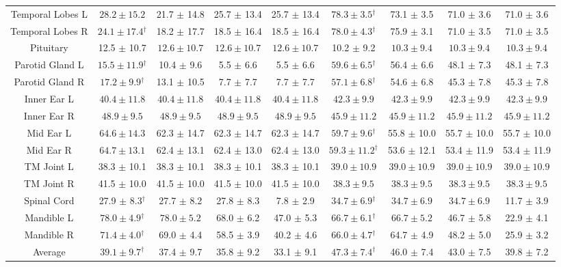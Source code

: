 \begin{table}[t!]
{\begin{tabular}{ccccccccc}
Temporal Lobes L &$\bm{28.2\pm15.2}$&21.7 $\pm$ 14.8& 25.7 $\pm$ 13.4& 25.7 $\pm$ 13.4&  $\bm{78.3\pm3.5}$$^\dagger$&  73.1 $\pm$ 3.5&   71.0 $\pm$ 3.6&  71.0 $\pm$ 3.6\\
Temporal Lobes R &$\bm{24.1\pm17.4}$$^\dagger$&18.2 $\pm$ 17.7& 18.5 $\pm$ 16.4& 18.5 $\pm$ 16.4&  $\bm{78.0\pm4.3}$$^\dagger$&  75.9 $\pm$ 3.1&   71.0 $\pm$ 3.5&  71.0 $\pm$ 3.5\\
Pituitary &12.5 $\pm$ 10.7&$\bm{12.6\pm10.7}$&$\bm{12.6\pm10.7}$&$\bm{12.6\pm10.7}$&  10.2 $\pm$ 9.2&  $\bm{10.3\pm9.4}$&   $\bm{10.3\pm9.4}$&  $\bm{10.3\pm9.4}$\\
Parotid Gland L &$\bm{15.5\pm11.9}$$^\dagger$& 10.4 $\pm$ 9.6& 5.5 $\pm$ 6.6& 5.5 $\pm$ 6.6&  $\bm{59.6\pm6.5}$$^\dagger$&  56.4 $\pm$ 6.6&   48.1 $\pm$ 7.3&  48.1 $\pm$ 7.3\\
Parotid Gland R &$\bm{17.2\pm9.9}$$^\dagger$&13.1 $\pm$ 10.5& 7.7 $\pm$ 7.7& 7.7 $\pm$ 7.7&  $\bm{57.1\pm6.8}$$^\dagger$ &  54.6 $\pm$ 6.8&   45.3 $\pm$ 7.8&  45.3 $\pm$ 7.8\\
Inner Ear L &$\bm{40.4\pm11.8}$&$\bm{40.4\pm11.8}$&$\bm{40.4\pm11.8}$&$\bm{40.4\pm11.8}$&  $\bm{42.3\pm9.9}$&  $\bm{42.3\pm9.9}$&  $\bm{42.3\pm9.9}$ & $\bm{42.3\pm9.9}$ \\
Inner Ear R &$\bm{48.9\pm9.5}$&$\bm{48.9\pm9.5}$&$\bm{48.9\pm9.5}$&$\bm{48.9\pm9.5}$& $\bm{45.9\pm11.2}$ & $\bm{45.9\pm11.2}$ & $\bm{45.9\pm11.2}$ & $\bm{45.9\pm11.2}$ \\
Mid Ear L &$\bm{64.6\pm14.3}$&62.3 $\pm$ 14.7& 62.3 $\pm$ 14.7& 62.3 $\pm$ 14.7& $\bm{59.7\pm9.6}$$^\dagger$ & 55.8 $\pm$ 10.0&  55.7 $\pm$ 10.0& 55.7 $\pm$ 10.0\\
Mid Ear R &$\bm{64.7\pm13.1}$&62.4 $\pm$ 13.1& 62.4 $\pm$ 13.0& 62.4 $\pm$ 13.0& $\bm{59.3\pm11.2}$$^\dagger$ & 53.6 $\pm$ 12.1&  53.4 $\pm$ 11.9& 53.4 $\pm$ 11.9\\
TM Joint L &38.3 $\pm$ 10.1&38.3 $\pm$ 10.1& 38.3 $\pm$ 10.1& 38.3 $\pm$ 10.1& $\bm{39.0\pm10.9}$ & $\bm{39.0\pm10.9}$ & $\bm{39.0\pm10.9}$ & $\bm{39.0\pm10.9}$ \\
TM Joint R &41.5 $\pm$ 10.0&41.5 $\pm$ 10.0& 41.5 $\pm$ 10.0& 41.5 $\pm$ 10.0&  $\bm{38.3\pm9.5}$&  $\bm{38.3\pm9.5}$&  $\bm{38.3\pm9.5}$& $\bm{38.3\pm9.5}$\\
Spinal Cord & 27.9 $\pm$ 8.3$^\dagger$& 27.7 $\pm$ 8.2&27.8 $\pm$ 8.3& 7.8 $\pm$ 2.9&  $\bm{34.7\pm6.9}$$^\dagger$ &  $\bm{34.7\pm6.9}$& $\bm{34.7\pm6.9}$& 11.7 $\pm$ 3.9\\
Mandible L & $\bm{78.0\pm4.9}$$^\dagger$& $\bm{78.0\pm5.2}$&68.0 $\pm$ 6.2& 47.0 $\pm$ 5.3& $\bm{66.7\pm6.1}$$^\dagger$ &  $\bm{66.7\pm5.2}$ &  46.7 $\pm$ 5.8&  22.9 $\pm$ 4.1\\
Mandible R & $\bm{71.4\pm4.0}$$^\dagger$ & 69.0 $\pm$ 4.4&58.5 $\pm$ 3.9& 40.2 $\pm$ 4.6& $\bm{66.0\pm4.7}$$^\dagger$ &  64.7 $\pm$ 4.9&   48.2 $\pm$ 5.0&  25.9 $\pm$ 3.2\\
\hline
Average & $\bm{39.1\pm9.7}$$^\dagger$ & 37.4 $\pm$ 9.7 & 35.8 $\pm$ 9.2 & 33.1 $\pm$ 9.1 & $\bm{47.3\pm7.4}$$^\dagger$ & 46.0 $\pm$ 7.4 & 43.0 $\pm$ 7.5 & 39.8 $\pm$ 7.2 \\ 
\bottomrule[1.5pt]
\end{tabular}}
\label{tab:8}
\end{table}